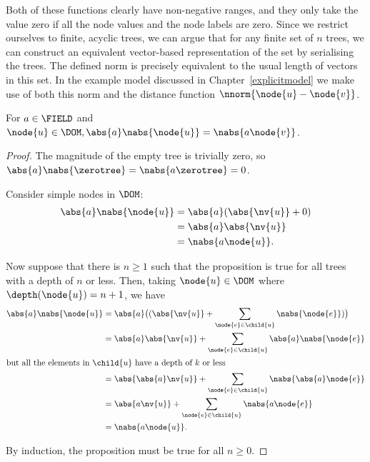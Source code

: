 Both of these functions clearly have non-negative ranges, and they
only take the value zero if all the node values and the node labels
are zero.  Since we restrict ourselves to finite, acyclic trees, we
can argue that for any finite set of $n$ trees, we can construct an
equivalent vector-based representation of the set by serialising the trees.
The defined norm is precisely equivalent to the usual length
of vectors in this set.
In the example model discussed in Chapter~\ref{explicitmodel} we 
make use of both this norm and the distance function
$\nnorm{\node{u}-\node{v}}$.

\begin{proposition}\label{absolutehomogeneity}
  For \(a \in \FIELD\) and \(\node{u} \in \DOM, \abs{a}\nabs{\node{u}} =
  \nabs{a \node{v}}\).
\begin{proof}
  The magnitude of the empty tree is trivially zero, so \(\abs{a}\nabs{\zerotree} =
  \nabs{a\zerotree} = 0\).

  Consider simple nodes in $\DOM$:
  \begin{align*}
      \abs{a}\nabs{\node{u}} &= \abs{a}(\abs{\nv{u}} + 0) \\
      &= \abs{a}\abs{\nv{u}} \\
      &= \nabs{a \node{u}}.
  \end{align*}

  Now suppose that there is \(n \ge 1\) such that the proposition is true for
  all trees with a depth of \(n\) or less. Then, taking \(\node{u} \in
  \DOM\) where \(\depth(\node{u}) = n+1\), we have
  \begin{align*}
      \abs{a}\nabs{\node{u}} &= \abs{a}\bigl((\abs{\nv{u}} + \sum_{\node{e}\in\child{u}}\nabs{\node{e}})\bigr) \\
      &= \abs{a}\abs{\nv{u}} + \sum_{\node{e}\in\child{u}}\abs{a}\nabs{\node{e}}\\
      \intertext{but all the elements in \(\child{u}\) have a depth of \(k\) or less}
      &= \abs{\abs{a}\nv{u}} + \sum_{\node{e}\in\child{u}}\nabs{\abs{a}\node{e}} \\
      &= \abs{a\nv{u}} + \sum_{\node{e}\in\child{u}}\nabs{a \node{e}} \\
      &= \nabs{a \node{u}}.
  \end{align*}

  By induction, the proposition must be true for all \(n \geq 0\).
\end{proof}
\end{proposition}


